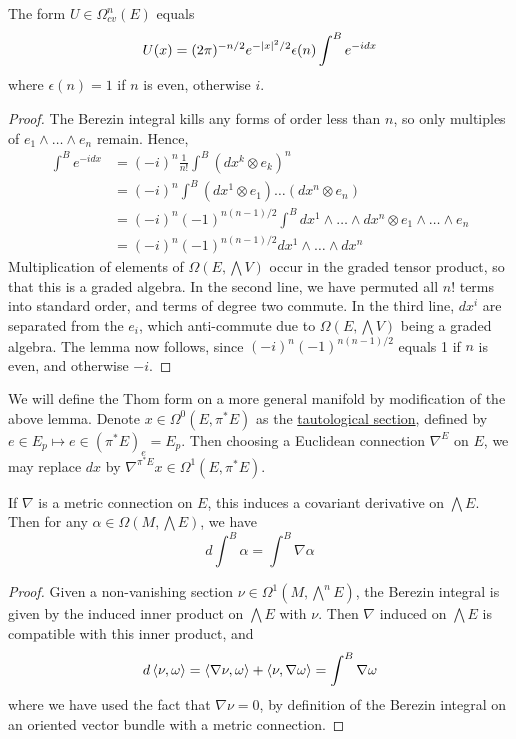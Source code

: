 \begin{lem} \label{lem:gaussian_integral} %
	The form $U\in \Omega^n_{cv}(E)$ equals 
	\[
		 U(x) = (2\pi)^{-n/2} e^{-\abs{x}^2 /2} \epsilon(n)\int^B e^{-idx}
	\] 
	where $\epsilon(n)=1$ if  $n$ is even, otherwise  $i$.
\end{lem}
\begin{proof}
	The Berezin integral kills any forms of order less than $n$, so only
	multiples of $e_1 \wedge \ldots\wedge e_n$ remain.
	Hence,
	\begin{align*}
		\int^B e^{-idx} 
		&= (-i)^n \frac{1}{n!}\int^B (dx^k\otimes e_k)^n \\
		&= (-i)^n \int^B (dx^1\otimes e_1) \ldots(dx^n\otimes e_n) \\
		&= (-i)^n(-1)^{n(n-1)/2} \int^B dx^1\wedge \ldots\wedge dx^n\otimes e_1 \wedge\ldots\wedge e_n \\
		&= (-i)^n(-1)^{n(n-1)/2} dx^1\wedge \ldots\wedge dx^n
	\end{align*}
	Multiplication of elements of $\Omega(E,\bigwedge V)$ occur in
	the graded tensor product, so that this is a graded algebra. 
	In the second line, we have permuted all $n!$ terms into standard order, and
	terms of degree two commute.
	In the third line, $dx^i$ are separated from the  $e_i$, which
	anti-commute due to  $\Omega(E,\bigwedge V)$ being a graded algebra. 
	The lemma now follows, since
	$(-i)^n(-1)^{n(n-1)/2}$ equals 1 if $n$ is even, and otherwise  $-i$. 
\end{proof}
We will define the Thom form on a more general manifold by modification of the
above lemma. Denote $x \in \Omega^0(E,\pi^*E)$ as the \underline{tautological
section}, defined by $e\in E_p \mapsto e\in (\pi^*E)_{e} = E_{p}$.
Then choosing a Euclidean connection $\nabla^E$ on  $E$, we may replace  $dx$ by 
$\nabla^{\pi^*E} x \in \Omega^1(E,\pi^*E)$.

\begin{prop} \label{prop:derivative_berezin} %
	If $\nabla$ is a metric connection on  $E$, this induces a covariant
	derivative on $\bigwedge E$. Then for any
	$\alpha\in\Omega(M,\bigwedge E)$, we have 
	\[
	d\int^B \alpha = \int^B \nabla\alpha
	\] 
\end{prop}
\begin{proof} 
	Given a non-vanishing section $\nu\in \Omega^1(M,\bigwedge^nE)$,
	the Berezin integral is given by the induced inner product on $\bigwedge E$
	with  $\nu$. Then  $\nabla$ induced on  $\bigwedge E$ is compatible with
	this inner product, and 
	\[
	d\gen{\nu,\omega} = \gen{\nabla \nu, \omega} + \gen{\nu, \nabla \omega}
	=\int^B \nabla\omega
	\] 
	where we have used the fact that $\nabla \nu = 0$, by definition of the
	Berezin integral on an oriented vector bundle with a metric connection.
\end{proof}

